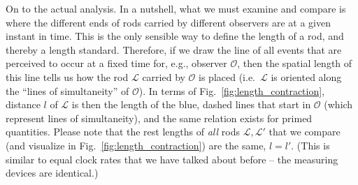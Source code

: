 \documentclass[../relativity_main.tex]{subfiles}
\begin{document}
On to the actual analysis. In a nutshell, what we must examine and compare is where the different ends of rods carried by different observers are at a given instant in time. This is the only sensible way to define the length of a rod, and thereby a length standard. Therefore, if we draw the line of all events that are perceived to occur at a fixed time for, e.g., observer $\mathcal{O}$, then the spatial length of this line tells us how the rod $\mathcal{L}$ carried by $\mathcal{O}$ is placed (i.e.~$\mathcal{L}$ is oriented along the \enquote{lines of simultaneity} of $\mathcal{O}$). In terms of Fig.~\ref{fig:length_contraction}, distance $l$ of $\mathcal{L}$ is then the length of the blue, dashed lines that start in $\mathcal{O}$ (which represent lines of simultaneity), and the same relation exists for primed quantities. Please note that the rest lengths of \emph{all} rods $\mathcal{L}, \mathcal{L}'$ that we compare (and visualize in Fig.~\ref{fig:length_contraction}) are the same, $l = l'$. (This is similar to equal clock rates that we have talked about before -- the measuring devices are identical.)\\
\end{document}
